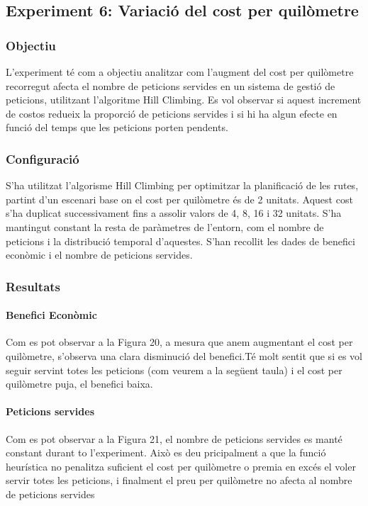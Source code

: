 
\subsection{Experiment 6: Variació del cost per quilòmetre}

\subsubsection{Objectiu}
L'experiment té com a objectiu analitzar com l'augment del cost per quilòmetre recorregut afecta el nombre de peticions servides en un sistema de gestió de peticions, utilitzant l'algoritme Hill Climbing. Es vol observar si aquest increment de costos redueix la proporció de peticions servides i si hi ha algun efecte en funció del temps que les peticions porten pendents.

\subsubsection{Configuració}
S'ha utilitzat l'algorisme Hill Climbing per optimitzar la planificació de les rutes, partint d'un escenari base on el cost per quilòmetre és de 2 unitats. Aquest cost s'ha duplicat successivament fins a assolir valors de 4, 8, 16 i 32 unitats. S'ha mantingut constant la resta de paràmetres de l'entorn, com el nombre de peticions i la distribució temporal d'aquestes. S'han recollit les dades de benefici econòmic i el nombre de peticions servides.

\subsubsection{Resultats}

\paragraph{Benefici Econòmic}
Com es pot observar a la Figura 20, a mesura que anem augmentant el cost per quilòmetre, s'observa una clara disminució del benefici.Té molt sentit que si es vol seguir servint totes les peticions (com veurem a la següent taula) i el cost per quilòmetre puja, el benefici baixa.



\paragraph{Peticions servides}
Com es pot observar a la Figura 21, el nombre de peticions servides es manté constant durant to l'experiment. Això es deu pricipalment a que la funció heurística no penalitza suficient el cost per quilòmetre o premia en excés el voler servir totes les peticions, i finalment el preu per quilòmetre no afecta al nombre de peticions servides 


